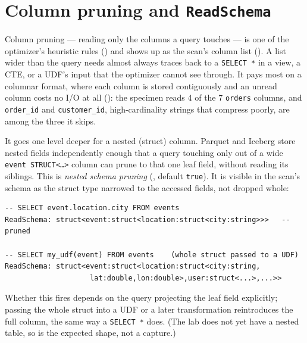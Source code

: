 \section{Column pruning and \texttt{ReadSchema}}
\label{sec:pruning-column}

Column pruning --- reading only the columns a query touches --- is one of the
optimizer's heuristic rules () and shows up as the scan's
column list (). A list wider than the query needs
almost always traces back to a \texttt{SELECT *} in a view, a CTE, or a UDF's
input that the optimizer cannot see through. It pays most on a columnar format,
where each column is stored contiguously and an unread column costs no I/O at all
(): the specimen reads 4 of the 7 \texttt{orders}
columns, and \texttt{order\_id} and \texttt{customer\_id}, high-cardinality
strings that compress poorly, are among the three it skips.

It goes one level deeper for a nested (struct) column. Parquet and Iceberg store
nested fields independently enough that a query touching only
 out of a wide \texttt{event STRUCT<\ldots>} column can
prune to that one leaf field, without reading its siblings. This is
\emph{nested schema pruning}
(, default \texttt{true}).
It is visible in the scan's schema as the struct type narrowed to the accessed
fields, not dropped whole:

\begin{lstlisting}[language=text,numbers=none,style=plan,caption={The read schema before and after nested pruning (shape only)},captionpos=b,label=lst:pruning-readschema]
-- SELECT event.location.city FROM events
ReadSchema: struct<event:struct<location:struct<city:string>>>   -- pruned

-- SELECT my_udf(event) FROM events    (whole struct passed to a UDF)
ReadSchema: struct<event:struct<location:struct<city:string,
                    lat:double,lon:double>,user:struct<...>,...>>
\end{lstlisting}

Whether this fires depends on the query projecting the leaf field explicitly;
passing the whole struct into a UDF or a later transformation reintroduces the
full column, the same way a \texttt{SELECT *} does. (The lab does not yet have a
nested table, so  is the expected shape, not a capture.)

